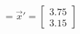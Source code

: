 \documentclass[preview]{standalone}
\begin{document}
\begin{align*}
= \vec{x}' = \begin{bmatrix} 3.75 \\ 3.15 \end{bmatrix}
\end{align*}
\end{document}
